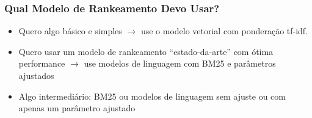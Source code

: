 \documentclass[compress]{beamer}
\def\myblue#1{\textcolor{texblue}{#1}}
\def\oper#1{{\sc #1}} %
\begin{document}



\begin{frame}[<+->]
\frametitle{Qual Modelo de Rankeamento Devo Usar?}
\pause[2]

\begin{itemize}
\item Quero algo básico e simples $\rightarrow$ use o modelo vetorial com ponderação tf-idf.
\item Quero usar um modelo de rankeamento ``estado-da-arte'' com ótima performance $\rightarrow$ use modelos de linguagem com BM25 e \myblue{parâmetros ajustados}
\item Algo intermediário: BM25 ou modelos de linguagem sem ajuste ou com apenas um parâmetro ajustado

\end{itemize}


\end{frame}
\end{document}
